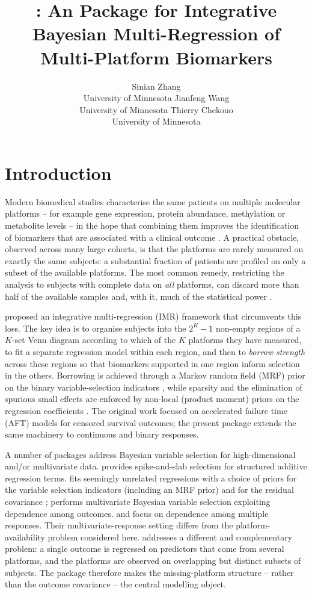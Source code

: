 \documentclass[article]{jss}
\author{Sinian Zhang\\University of Minnesota \And
        Jianfeng Wang\\University of Minnesota \And
        Thierry Chekouo\\University of Minnesota}
\title{\pkg{IntegMultiReg}: An \proglang{R} Package for Integrative
  Bayesian Multi-Regression of Multi-Platform Biomarkers}
\begin{document}
\clearpage

\section{Introduction}\label{sec:intro}

Modern biomedical studies characterise the same patients on multiple molecular
platforms -- for example gene expression, protein abundance, methylation or
metabolite levels -- in the hope that combining them improves the identification
of biomarkers that are associated with a clinical outcome
\citep{chekouo2015,chekouo2017}. A practical obstacle, observed across many
large cohorts, is that the platforms are rarely measured on exactly the same
subjects: a substantial fraction of patients are profiled on only a subset of
the available platforms. The most common remedy, restricting the analysis to
subjects with complete data on \emph{all} platforms, can discard more than half
of the available samples and, with it, much of the statistical power
\citep{chekouo2017}.

\citet{chekouo2017} proposed an integrative multi-regression (IMR) framework
that circumvents this loss. The key idea is to organise subjects into the
$2^{K}-1$ non-empty regions of a $K$-set Venn diagram according to which of the
$K$ platforms they have measured, to fit a separate regression model within
each region, and then to \emph{borrow strength} across these regions so that
biomarkers supported in one region inform selection in the others. Borrowing is
achieved through a Markov random field (MRF) prior on the binary
variable-selection indicators \citep{li2010,stingo2011,peterson2015}, while
sparsity and the elimination of spurious small effects are enforced by non-local
(product moment) priors on the regression coefficients
\citep{johnson2012,rossell2017}. The original work focused on accelerated
failure time (AFT) models for censored survival outcomes; the present package
extends the same machinery to continuous and binary responses.

A number of  packages address Bayesian variable selection
for high-dimensional and/or multivariate data. 
\citep{scheipl2011} provides spike-and-slab selection for structured additive
regression terms.  \citep{zhao2021}
fits seemingly unrelated regressions with a choice of priors for the variable
selection indicators (including an MRF prior) and for the residual covariance
\citep{bottolo2021};  \citep{lee2017} performs multivariate
Bayesian variable selection exploiting dependence among outcomes.
 and  focus on dependence among multiple responses. Their
multivariate-response setting differs from the platform-availability problem
considered here.  addresses a different and complementary problem:
a single outcome is regressed on predictors that come from several platforms,
and the platforms are observed on overlapping but distinct subsets of subjects.
The package therefore makes the missing-platform structure -- rather than the
outcome covariance -- the central modelling object.
\end{document}
